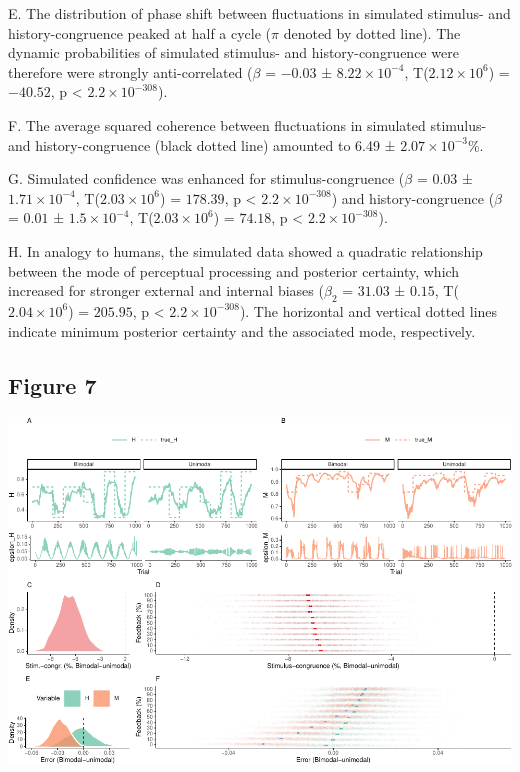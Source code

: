 \documentclass[
]{article}
\begin{document}
E. The distribution of phase shift between fluctuations in simulated
stimulus- and history-congruence peaked at half a cycle (\(\pi\) denoted
by dotted line). The dynamic probabilities of simulated stimulus- and
history-congruence were therefore were strongly anti-correlated
(\(\beta\) = \(-0.03\) ± \(\ensuremath{8.22\times 10^{-4}}\),
T(\(\ensuremath{2.12\times 10^{6}}\)) = \(-40.52\), p < \(\ensuremath{2.2\times 10^{-308}}\)).

F. The average squared coherence between fluctuations in simulated
stimulus- and history-congruence (black dotted line) amounted to 6.49 ±
\ensuremath{2.07\times 10^{-3}}\%.

G. Simulated confidence was enhanced for stimulus-congruence (\(\beta\)
= \(0.03\) ± \(\ensuremath{1.71\times 10^{-4}}\),
T(\(\ensuremath{2.03\times 10^{6}}\)) = \(178.39\), p < \(\ensuremath{2.2\times 10^{-308}}\)) and
history-congruence (\(\beta\) = \(0.01\) ±
\(\ensuremath{1.5\times 10^{-4}}\),
T(\(\ensuremath{2.03\times 10^{6}}\)) = \(74.18\), p < \(\ensuremath{2.2\times 10^{-308}}\)).

H. In analogy to humans, the simulated data showed a quadratic
relationship between the mode of perceptual processing and posterior
certainty, which increased for stronger external and internal biases
(\(\beta_2\) = \(31.03\) ± \(0.15\),
T(\(\ensuremath{2.04\times 10^{6}}\)) = \(205.95\), p < \(\ensuremath{2.2\times 10^{-308}}\)). The
horizontal and vertical dotted lines indicate minimum posterior
certainty and the associated mode, respectively.

\newpage

\hypertarget{figure-7}{%
\subsection{Figure 7}\label{figure-7}}

\includegraphics{modes_mouse_files/figure-latex/Figure_7-1.pdf}
\end{document}
